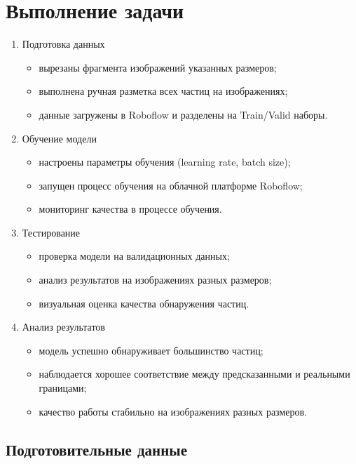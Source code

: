 \documentclass[12pt, a4paper]{report}
\begin{document}
	\section*{Выполнение задачи}
	\large
	\begin{enumerate}
		\item Подготовка данных
		\begin{itemize}
			\item вырезаны фрагмента изображений указанных размеров;
			\item выполнена ручная разметка всех частиц на изображениях;
			\item данные загружены в Roboflow и разделены на Train/Valid наборы.
		\end{itemize}
		\item Обучение модели
		\begin{itemize}
			\item настроены параметры обучения (learning rate, batch size);
			\item запущен процесс обучения на облачной платформе Roboflow;
			\item мониторинг качества в процессе обучения.
		\end{itemize}
		\item Тестирование
		\begin{itemize}
			\item проверка модели на валидационных данных;
			\item анализ результатов на изображениях разных размеров;
			\item визуальная оценка качества обнаружения частиц.
		\end{itemize}
		\item Анализ результатов
		\begin{itemize}
			\item модель успешно обнаруживает большинство частиц;
			\item наблюдается хорошее соответствие между предсказанными и реальными границами;
			\item качество работы стабильно на изображениях разных размеров.
		\end{itemize}
	\end{enumerate}

	\newpage
	\vfill

	\subsection*{Подготовительные данные}
	\large
\end{document}
